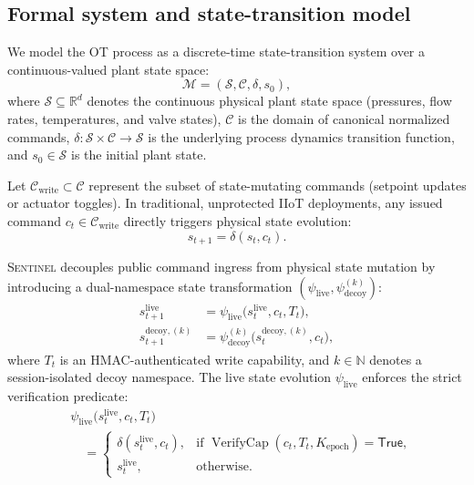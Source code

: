 \documentclass[journal]{IEEEtran}
\newcommand{\sentinel}{\textsc{Sentinel}}
\DeclareMathOperator{\VerifyCap}{VerifyCap}
\begin{document}
\subsection{Formal system and state-transition model}
We model the OT process as a discrete-time state-transition system over a continuous-valued plant state space:
\begin{equation}
\mathcal{M} = (\mathcal{S}, \mathcal{C}, \delta, s_0),
\end{equation}
where $\mathcal{S} \subseteq \mathbb{R}^d$ denotes the continuous physical plant state space (pressures, flow rates, temperatures, and valve states), $\mathcal{C}$ is the domain of canonical normalized commands, $\delta: \mathcal{S} \times \mathcal{C} \to \mathcal{S}$ is the underlying process dynamics transition function, and $s_0 \in \mathcal{S}$ is the initial plant state.

Let $\mathcal{C}_{\mathrm{write}} \subset \mathcal{C}$ represent the subset of state-mutating commands (setpoint updates or actuator toggles). In traditional, unprotected IIoT deployments, any issued command $c_t \in \mathcal{C}_{\mathrm{write}}$ directly triggers physical state evolution:
\begin{equation}
s_{t+1} = \delta(s_t, c_t).
\end{equation}

\sentinel{} decouples public command ingress from physical state mutation by introducing a dual-namespace state transformation $(\psi_{\mathrm{live}}, \psi_{\mathrm{decoy}}^{(k)})$:
\begin{align}
s_{t+1}^{\mathrm{live}} &= \psi_{\mathrm{live}}\bigl(s_t^{\mathrm{live}}, c_t, T_t\bigr), \\
s_{t+1}^{\mathrm{decoy},(k)} &= \psi_{\mathrm{decoy}}^{(k)}\bigl(s_t^{\mathrm{decoy},(k)}, c_t\bigr),
\end{align}
where $T_t$ is an HMAC-authenticated write capability, and $k \in \mathbb{N}$ denotes a session-isolated decoy namespace. The live state evolution $\psi_{\mathrm{live}}$ enforces the strict verification predicate:
\begin{align}
&\psi_{\mathrm{live}}\bigl(s_t^{\mathrm{live}}, c_t, T_t\bigr) \nonumber \\
&\quad = \begin{cases}
\delta(s_t^{\mathrm{live}}, c_t), & \text{if } \VerifyCap(c_t, T_t, K_{\mathrm{epoch}}) = \mathsf{True}, \\[3pt]
s_t^{\mathrm{live}}, & \text{otherwise}.
\end{cases}
\end{align}
\end{document}
